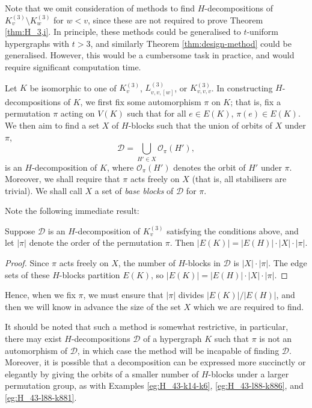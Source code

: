 Note that we omit consideration of methods to find $H$-decompositions of $K_{v}^{(3)} \setminus K_{w}^{(3)}$ for $w < v$, since these are not required to prove Theorem \ref{thm:H_3,i}.
In principle, these methods could be generalised to $t$-uniform hypergraphs with $t > 3$, and similarly Theorem \ref{thm:design-method} could be generalised. However, this would be a cumbersome task in practice, and would require significant computation time.

Let $K$ be isomorphic to one of $K_{v}^{(3)}$, $L_{v,v,[w]}^{(3)}$, or $K_{v,v,v}^{(3)}$.
In constructing $H$-decompositions of $K$, we first fix some automorphism $\pi$ on $K$; that is, fix a permutation $\pi$ acting on $V(K)$ such that for all $e \in E(K)$, $\pi(e) \in E(K)$. We then aim to find a set $X$ of $H$-blocks such that the union of orbits of $X$ under $\pi$,
\begin{equation} \label{eq:decomposition-orbit}
    \mathcal{D} = \bigcup_{H' \in X} \mathcal{O}_\pi(H'),
\end{equation}
is an $H$-decomposition of $K$, where $\mathcal{O}_\pi(H')$ denotes the orbit of $H'$ under $\pi$. Moreover, we shall require that $\pi$ acts freely on $X$ (that is, all stabilisers are trivial).
We shall call $X$ a set of {\em base blocks} of $\mathcal{D}$ for $\mathcal{\pi}$.

Note the following immediate result:

\begin{lemma} \label{lem:orbit-divisibility}
Suppose $\mathcal{D}$ is an $H$-decomposition of $K_{v}^{(3)}$ satisfying the conditions above, and let $|\pi|$ denote the order of the permutation $\pi$.
Then $|E(K)| = |E(H)| \cdot |X| \cdot |\pi|$.
\end{lemma}

\begin{proof}
Since $\pi$ acts freely on $X$, the number of $H$-blocks in $\mathcal{D}$ is $|X| \cdot |\pi|$. The edge sets of these $H$-blocks partition $E(K)$, so $|E(K)| = |E(H)| \cdot |X| \cdot |\pi|$.
\end{proof}

Hence, when we fix $\pi$, we must ensure that $|\pi|$ divides $|E(K)|/|E(H)|$, and then we will know in advance the size of the set $X$ which we are required to find.

It should be noted that such a method is somewhat restrictive, in particular, there may exist $H$-decompositions $\mathcal{D}$ of a hypergraph $K$ such that $\pi$ is not an automorphism of $\mathcal{D}$, in which case the method will be incapable of finding $\mathcal{D}$.
Moreover, it is possible that a decomposition can be expressed more succinctly or elegantly by giving the orbits of a smaller number of $H$-blocks under a larger permutation group, as with Examples \ref{eg:H_43-k14-k6}, \ref{eg:H_43-l88-k886}, and \ref{eg:H_43-l88-k881}.
